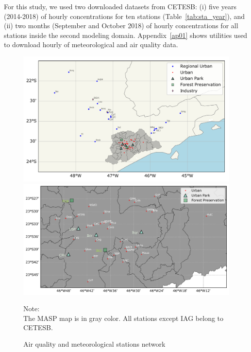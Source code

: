   For this study, we used two downloaded datasets from CETESB: (i) five years (2014-2018) of hourly concentrations for ten stations (Table~\ref{tab:sta_year}), and (ii) two months (September and October 2018) of hourly concentrations for all stations inside the second modeling domain.
  Appendix~\ref{ap01} shows utilities used to download hourly of meteorological and air quality data.
     \begin{figure}[htb]
		\includegraphics[width=1\textwidth]{fig/map_stations.pdf}
		\includegraphics[width=1\textwidth]{fig/MASP_stations.pdf}
  		\caption{Air quality and meteorological stations network}

  		{\scriptsize Note:\\ The MASP map is in gray color. All stations except IAG belong to CETESB.}
  		\label{fig:mapStations}
	\end{figure}
	
